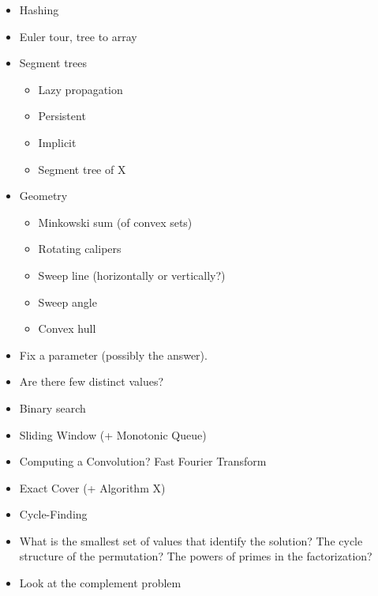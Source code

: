 \documentclass[9pt,a4paper,twocolumn,landscape,oneside]{amsart}
\newenvironment{myitemize}
{ \begin{itemize}[leftmargin=.5cm]
    \setlength{\itemsep}{0pt}
    \setlength{\parskip}{0pt}
    \setlength{\parsep}{0pt}     }
{ \end{itemize}                  }
\begin{document}
\begin{multicols*}{3}
\begin{myitemize}
\begin{itemize}
                        \item Aho-Corasick
                        \item eerTree
                        \item Work with $S+S$
                    \end{itemize}
                \item Hashing
                \item Euler tour, tree to array
                \item Segment trees
                    \begin{itemize}
                        \item Lazy propagation
                        \item Persistent
                        \item Implicit
                        \item Segment tree of X
                    \end{itemize}
                \item Geometry
                    \begin{itemize}
                        \item Minkowski sum (of convex sets)
                        \item Rotating calipers
                        \item Sweep line (horizontally or vertically?)
                        \item Sweep angle
                        \item Convex hull
                    \end{itemize}
                \item Fix a parameter (possibly the answer).
                \item Are there few distinct values?
                \item Binary search
                \item Sliding Window (+ Monotonic Queue)
                \item Computing a Convolution? Fast Fourier Transform
                \item Exact Cover (+ Algorithm X)
                \item Cycle-Finding
                \item What is the smallest set of values that identify the solution? The cycle structure of the permutation? The powers of primes in the factorization?
                \item Look at the complement problem

\end{myitemize}
\end{multicols*}
\end{document}
